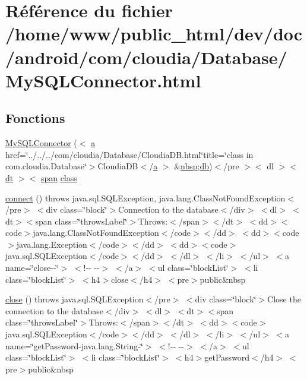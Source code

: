 \hypertarget{_my_s_q_l_connector_8html}{\section{Référence du fichier /home/www/public\-\_\-html/dev/doc/android/com/cloudia/\-Database/\-My\-S\-Q\-L\-Connector.html}
\label{_my_s_q_l_connector_8html}
}
\subsection*{Fonctions}
\begin{DoxyCompactItemize}
\item 
\hyperlink{_my_s_q_l_connector_8html_a825fc62a5dc227c8ae6de1c7452049f7}{My\-S\-Q\-L\-Connector} ($<$ \hyperlink{style_8css_a5e8981582017bb8b84c21f148345d1f7}{a} href=\char`\"{}../../../com/cloudia/Database/Cloudia\-D\-B.\-html\char`\"{}title=\char`\"{}class in com.\-cloudia.\-Database\char`\"{}$>$Cloudia\-D\-B$<$/\hyperlink{style_8css_a5e8981582017bb8b84c21f148345d1f7}{a} $>$ \&\hyperlink{_tools_8html_aef915316f784c9063d942974538301a6}{nbsp};\hyperlink{db_8js_ac6a1b1fd00c35062aea99d6f37a15054}{db})$<$/pre $>$$<$ dl $>$$<$ \hyperlink{stylesheet_8css_a107565fb4039d33b041380d6e0ea1d80}{dt} $>$$<$ \hyperlink{stylesheet_8css_a8343996ebcf16220b04e54659aac31cc}{span} \hyperlink{_tools_8html_acf06f836132665ba8114f5a414c2403f}{class}
\item 
\hyperlink{_my_s_q_l_connector_8html_a78572828d11dcdf2a498497d9001d557}{connect} ()  throws java.\-sql.\-S\-Q\-L\-Exception,                     java.\-lang.\-Class\-Not\-Found\-Exception$<$/pre$>$ $<$div class=\char`\"{}block\char`\"{}$>$\-Connection to the database$<$/div$>$ $<$dl$>$ $<$dt$>$$<$span class=\char`\"{}throws\-Label\char`\"{}$>$\-Throws\-:$<$/span$>$$<$/dt$>$ $<$dd$>$$<$code$>$java.\-lang.\-Class\-Not\-Found\-Exception$<$/code$>$$<$/dd$>$ $<$dd$>$$<$code$>$java.\-lang.\-Exception$<$/code$>$$<$/dd$>$ $<$dd$>$$<$code$>$java.\-sql.\-S\-Q\-L\-Exception$<$/code$>$$<$/dd$>$ $<$/dl$>$ $<$/li$>$ $<$/ul$>$ $<$a name=\char`\"{}close-\/-\/\char`\"{}$>$ $<$!-\/-\/   -\/-\/$>$ $<$/a$>$ $<$ul class=\char`\"{}block\-List\char`\"{}$>$ $<$li class=\char`\"{}block\-List\char`\"{}$>$ $<$h4$>$close$<$/h4$>$ $<$pre$>$public\&nbsp
\item 
\hyperlink{_my_s_q_l_connector_8html_aa69c8bf1f1dcf4e72552efff1fe3e87e}{close} ()  throws java.\-sql.\-S\-Q\-L\-Exception$<$/pre$>$ $<$div class=\char`\"{}block\char`\"{}$>$\-Close the connection to the database$<$/div$>$ $<$dl$>$ $<$dt$>$$<$span class=\char`\"{}throws\-Label\char`\"{}$>$\-Throws\-:$<$/span$>$$<$/dt$>$ $<$dd$>$$<$code$>$java.\-sql.\-S\-Q\-L\-Exception$<$/code$>$$<$/dd$>$ $<$/dl$>$ $<$/li$>$ $<$/ul$>$ $<$a name=\char`\"{}get\-Password-\/java.\-lang.\-String-\/\char`\"{}$>$ $<$!-\/-\/   -\/-\/$>$ $<$/a$>$ $<$ul class=\char`\"{}block\-List\char`\"{}$>$ $<$li class=\char`\"{}block\-List\char`\"{}$>$ $<$h4$>$get\-Password$<$/h4$>$ $<$pre$>$public\&nbsp
$$
\end{DoxyCompactItemize}
